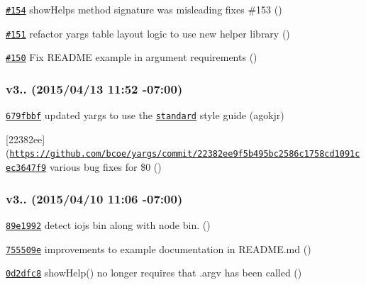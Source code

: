 \begin{DoxyItemize}
\item \href{https://github.com/bcoe/yargs/pull/154}{\tt \#154} show\+Help\textquotesingle{}s method signature was misleading fixes \#153 ()
\item \href{https://github.com/bcoe/yargs/pull/151}{\tt \#151} refactor yargs\textquotesingle{} table layout logic to use new helper library ()
\item \href{https://github.com/bcoe/yargs/pull/150}{\tt \#150} Fix R\+E\+A\+D\+ME example in argument requirements ()
\end{DoxyItemize}

\subsubsection*{v3.. (2015/04/13 11\+:52 -\/07\+:00)}


\begin{DoxyItemize}
\item \href{https://github.com/bcoe/yargs/commit/679fbbf55904030ccee8a2635e8e5f46551ab2f0}{\tt 679fbbf} updated yargs to use the \href{https://github.com/feross/standard}{\tt standard} style guide (agokjr)
\item \mbox{[}22382ee\mbox{]}(\href{https://github.com/bcoe/yargs/commit/22382ee9f5b495bc2586c1758cd1091cec3647f9}{\tt https\+://github.\+com/bcoe/yargs/commit/22382ee9f5b495bc2586c1758cd1091cec3647f9} various bug fixes for \$0 ()
\end{DoxyItemize}

\subsubsection*{v3.. (2015/04/10 11\+:06 -\/07\+:00)}


\begin{DoxyItemize}
\item \href{https://github.com/bcoe/yargs/commit/89e1992a004ba73609b5f9ee6890c4060857aba4}{\tt 89e1992} detect iojs bin along with node bin. ()
\item \href{https://github.com/bcoe/yargs/commit/755509ea90041e5f7833bba3b8c5deffe56f0aab}{\tt 755509e} improvements to example documentation in R\+E\+A\+D\+M\+E.\+md ()
\item \href{https://github.com/bcoe/yargs/commit/0d2dfc822a43418242908ad97ddd5291a1b35dc6}{\tt 0d2dfc8} show\+Help() no longer requires that .argv has been called ()
\end{DoxyItemize}

